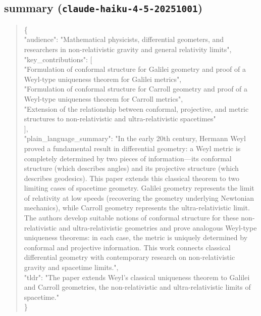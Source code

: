 \documentclass[11pt]{article}
\begin{document}
\subsection*{summary (\texttt{claude-haiku-4-5-20251001})}
\begin{quote}\small\ttfamily\raggedright
\{\\
  "audience": "Mathematical physicists, differential geometers, and researchers in non-relativistic gravity and general relativity limits",\\
  "key\_contributions": [\\
    "Formulation of conformal structure for Galilei geometry and proof of a Weyl-type uniqueness theorem for Galilei metrics",\\
    "Formulation of conformal structure for Carroll geometry and proof of a Weyl-type uniqueness theorem for Carroll metrics",\\
    "Extension of the relationship between conformal, projective, and metric structures to non-relativistic and ultra-relativistic spacetimes"\\
  ],\\
  "plain\_language\_summary": "In the early 20th century, Hermann Weyl proved a fundamental result in differential geometry: a Weyl metric is completely determined by two pieces of information—its conformal structure (which describes angles) and its projective structure (which describes geodesics). This paper extends this classical theorem to two limiting cases of spacetime geometry. Galilei geometry represents the limit of relativity at low speeds (recovering the geometry underlying Newtonian mechanics), while Carroll geometry represents the ultra-relativistic limit. The authors develop suitable notions of conformal structure for these non-relativistic and ultra-relativistic geometries and prove analogous Weyl-type uniqueness theorems: in each case, the metric is uniquely determined by conformal and projective information. This work connects classical differential geometry with contemporary research on non-relativistic gravity and spacetime limits.",\\
  "tldr": "The paper extends Weyl's classical uniqueness theorem to Galilei and Carroll geometries, the non-relativistic and ultra-relativistic limits of spacetime."\\
\}\\
\end{quote}
\end{document}
